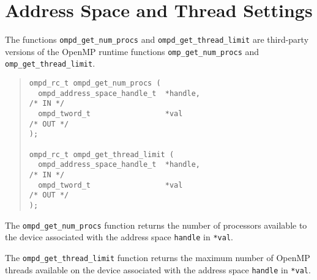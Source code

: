 \section{Address Space and Thread Settings}

The functions \verb|ompd_get_num_procs| and
\verb|ompd_get_thread_limit| are third-party versions of the OpenMP
runtime functions \verb|omp_get_num_procs| and \verb|omp_get_thread_limit|.

\begin{quote}
\begin{lstlisting}
ompd_rc_t ompd_get_num_procs (
  ompd_address_space_handle_t  *handle,                             /* IN */
  ompd_tword_t                 *val                                /* OUT */
); 

ompd_rc_t ompd_get_thread_limit (
  ompd_address_space_handle_t  *handle,                             /* IN */
  ompd_tword_t                 *val                                /* OUT */
); 
\end{lstlisting}
\end{quote}

The \verb|ompd_get_num_procs| function returns the number of
processors available to the device associated with the address space
\verb|handle| in \verb|*val|.

The \verb|ompd_get_thread_limit| function returns the maximum number
of OpenMP threads available on the device associated with the address
space \verb|handle| in \verb|*val|.